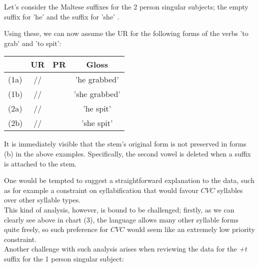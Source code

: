 \documentclass[11pt,draft]{article}
\begin{document}
Let's consider the Maltese suffixes for the 2 person singular subjects; the empty suffix \textipa{+\O} for 'he' and the suffix \textsl{} for 'she' \cite{brame1974}.

Using these, we can now assume the UR for the following forms of the verbs \textsl{} 'to grab' and \textsl{} 'to spit':

\begin{table}[htdp]
\begin{tabularx}{400pt}{|l| C | C | C|}
	\hline
	&
	UR &
	PR &
	Gloss \\\hline\hline
	
	(1a) &
	// &
	 &
	'he grabbed' \\
	
	(1b) &
	// &
	 &
	'she grabbed' \\
	
	\hline
	
	(2a) &
	// &
	 &
	'he spit' \\
	
	(2b) &
	// &
	 &
	'she spit' \\
	
	\hline
	
\end{tabularx}
\end{table}

It is immediately visible that the stem's original form is not preserved in forms (b) in the above examples. Specifically, the second vowel is deleted when a suffix is attached to the stem.

One would be tempted to suggest a straightforward explanation to the data, such as for example a constraint on syllabification that would favour $CVC$ syllables over other syllable types.
\\

This kind of analysis, however, is bound to be challenged; firstly, as we can clearly see above in chart (3), the language allows many other syllable forms quite freely, so such preference for $CVC$ would seem like an extremely low priority constraint.
\\

Another challenge with such analysis arises when reviewing the data for the \textsl{+t} suffix for the 1 person singular subject:
\end{document}
